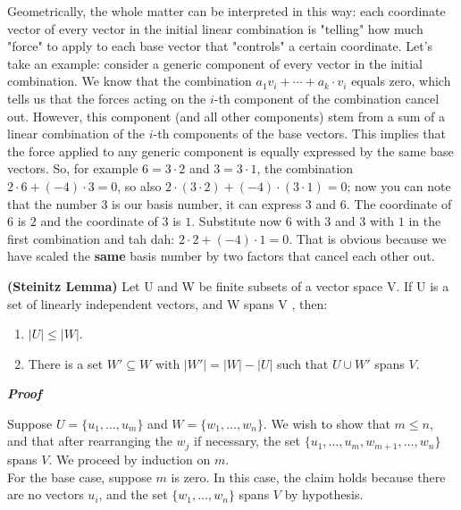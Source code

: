 Geometrically, the whole matter can be interpreted in this way: each coordinate vector of every vector in the initial linear combination is "telling" how much "force" to apply to each base vector that "controls" a certain coordinate. Let's take an example: consider a generic component of every vector in the initial combination. We know that the combination $a_1 v_i + \cdots + a_k \cdot v_i$ equals zero, which tells us that the forces acting on the $i$-th component of the combination cancel out. However, this component (and all other components) stem from a sum of a linear combination of the $i$-th components of the base vectors. This implies that the force applied to any generic component is equally expressed by the same base vectors. So, for example $6=3\cdot2$ and $3=3\cdot1$, the combination $2 \cdot 6 + (-4) \cdot 3 = 0$, so also $2 \cdot (3\cdot2) + (-4) \cdot (3\cdot1) = 0$; now you can note that the number $3$ is our basis number, it can express $3$ and $6$.
The coordinate of $6$ is $2$ and the coordinate of $3$ is $1$. Substitute now $6$ with $3$ and $3$ with $1$ in the first combination and tah dah: $2 \cdot 2 + (-4) \cdot 1 = 0$. That is obvious because we have scaled the \textbf{same} basis number by two factors that cancel each other out.

\begin{lemma}
    {\normalfont \textbf{(Steinitz Lemma)}}
    Let U and W be finite subsets of a vector space V. If U is a set of linearly independent vectors, and W spans V , then: 
    \begin{enumerate}
        \item $|U| \leq |W|$.
        \item There is a set $W' \subseteq W$ with $|W'| = |W| - |U|$ such that $U \cup W'$ spans $V$.
    \end{enumerate}
    \label{lemma:steinitz}
\end{lemma}

\textbf{\textit{Proof}}

Suppose $U = \{ u_1, \ldots, u_m \}$ and $W = \{ w_1, \ldots, w_n \}$. We wish to show that $m \leq n$, and that after rearranging the $w_j$ if necessary, the set $\{ u_1, \ldots, u_m, w_{m+1}, \ldots, w_n \}$ spans $V$. We proceed by induction on $m$.
\\

For the base case, suppose $m$ is zero. In this case, the claim holds because there are no vectors $u_i$, and the set $\{ w_1, \ldots, w_n \}$ spans $V$ by hypothesis.

